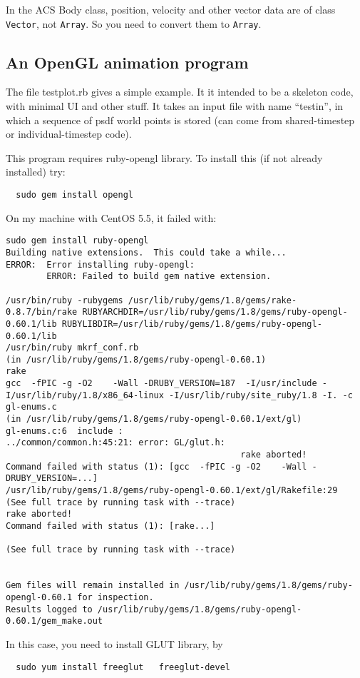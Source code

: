 \documentclass[12pt]{article}
\begin{document}
In the ACS Body class, position, velocity and other vector data are of
class {\tt Vector}, not {\tt Array}. So you need to convert them to
{\tt Array}.

\subsection{An OpenGL animation program}

The file testplot.rb gives a simple example. It it intended to be a
skeleton code, with minimal UI and other stuff. It takes an input file
with name ``testin'', in which a sequence of psdf world points is
stored (can come from shared-timestep or individual-timestep code).

This program requires ruby-opengl library. To install this (if not
already installed) try:
\begin{verbatim}
  sudo gem install opengl
\end{verbatim}
On my machine with CentOS 5.5, it failed with:
\begin{verbatim}
sudo gem install ruby-opengl
Building native extensions.  This could take a while...
ERROR:  Error installing ruby-opengl:
        ERROR: Failed to build gem native extension.

/usr/bin/ruby -rubygems /usr/lib/ruby/gems/1.8/gems/rake-0.8.7/bin/rake RUBYARCHDIR=/usr/lib/ruby/gems/1.8/gems/ruby-opengl-0.60.1/lib RUBYLIBDIR=/usr/lib/ruby/gems/1.8/gems/ruby-opengl-0.60.1/lib
/usr/bin/ruby mkrf_conf.rb
(in /usr/lib/ruby/gems/1.8/gems/ruby-opengl-0.60.1)
rake
gcc  -fPIC -g -O2    -Wall -DRUBY_VERSION=187  -I/usr/include -I/usr/lib/ruby/1.8/x86_64-linux -I/usr/lib/ruby/site_ruby/1.8 -I. -c gl-enums.c
(in /usr/lib/ruby/gems/1.8/gems/ruby-opengl-0.60.1/ext/gl)
gl-enums.c:6  include :
../common/common.h:45:21: error: GL/glut.h: 
                                              rake aborted!
Command failed with status (1): [gcc  -fPIC -g -O2    -Wall -DRUBY_VERSION=...]
/usr/lib/ruby/gems/1.8/gems/ruby-opengl-0.60.1/ext/gl/Rakefile:29
(See full trace by running task with --trace)
rake aborted!
Command failed with status (1): [rake...]

(See full trace by running task with --trace)


Gem files will remain installed in /usr/lib/ruby/gems/1.8/gems/ruby-opengl-0.60.1 for inspection.
Results logged to /usr/lib/ruby/gems/1.8/gems/ruby-opengl-0.60.1/gem_make.out
\end{verbatim}

In this case, you need to install GLUT library, by
\begin{verbatim}
  sudo yum install freeglut   freeglut-devel
\end{verbatim}

    
\end{document}
